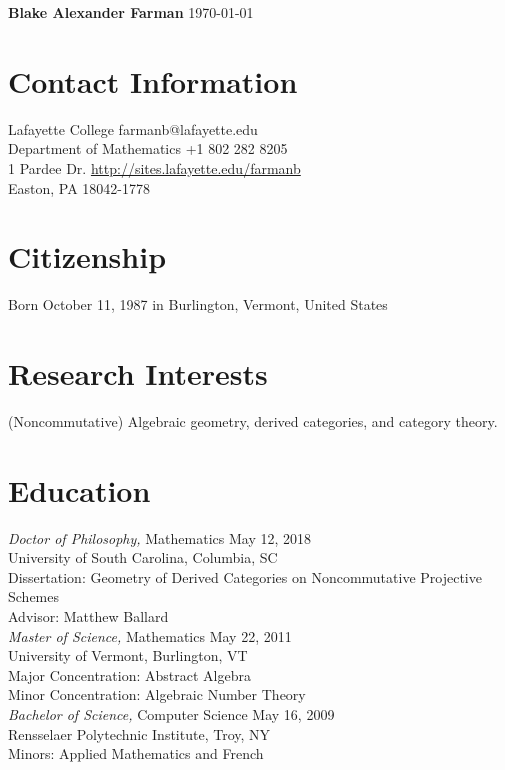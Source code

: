 \documentclass{article}
\begin{document}
\noindent\textbf{\large{Blake Alexander Farman}} \hfill \today\\
\noindent\makebox[\linewidth]{\rule{\textwidth}{0.4pt}}

\section*{Contact Information}
Lafayette College \hfill farmanb@lafayette.edu\\
Department of Mathematics \hfill +1 802 282 8205\\
1 Pardee Dr. \hfill \hyperref[http://sites.lafayette.edu/farmanb]{http://sites.lafayette.edu/farmanb}\\
Easton, PA 18042-1778

\section*{Citizenship}
Born October 11, 1987 in Burlington, Vermont, United States

\section*{Research Interests}
(Noncommutative) Algebraic geometry, derived categories, and category theory.

\section*{Education} 
\textsl{Doctor of Philosophy,} Mathematics \hfill  May 12, 2018\\
University of South Carolina, Columbia, SC\\
Dissertation: Geometry of Derived Categories on Noncommutative Projective Schemes\\
Advisor: Matthew Ballard\\

\noindent
\textsl{Master of Science,} Mathematics \hfill May 22, 2011\\
University of Vermont, Burlington, VT\\
Major Concentration: Abstract Algebra\\
Minor Concentration: Algebraic Number Theory\\

\noindent\textsl{Bachelor of Science,} Computer Science \hfill May 16, 2009\\
Rensselaer Polytechnic Institute, Troy, NY\\
Minors: Applied Mathematics and French
\end{document}
